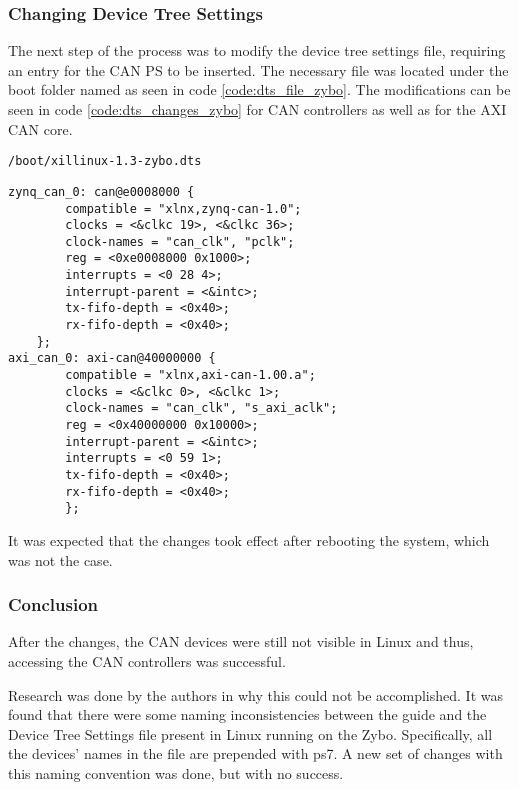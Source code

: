 \subsubsection*{Changing Device Tree Settings}
The next step of the process was to modify the device tree settings file, requiring an entry for the CAN PS to be inserted.
The necessary file was located under the boot folder named as seen in code \ref{code:dts_file_zybo}.
The modifications can be seen in code \ref{code:dts_changes_zybo} for CAN controllers as well as for the AXI CAN core.

\begin{lstlisting}[numbers=none,caption={Device tree settings file and its path.},label={code:dts_file_zybo}]
/boot/xillinux-1.3-zybo.dts
\end{lstlisting}
\begin{lstlisting}[caption={Device tree settings changes.},label={code:dts_changes_zybo}]
zynq_can_0: can@e0008000 {
        compatible = "xlnx,zynq-can-1.0";
        clocks = <&clkc 19>, <&clkc 36>;
        clock-names = "can_clk", "pclk";
        reg = <0xe0008000 0x1000>;
        interrupts = <0 28 4>;
        interrupt-parent = <&intc>;
        tx-fifo-depth = <0x40>;
        rx-fifo-depth = <0x40>;
    };
axi_can_0: axi-can@40000000 {
        compatible = "xlnx,axi-can-1.00.a";
        clocks = <&clkc 0>, <&clkc 1>;
        clock-names = "can_clk", "s_axi_aclk";
        reg = <0x40000000 0x10000>;
        interrupt-parent = <&intc>;
        interrupts = <0 59 1>;
        tx-fifo-depth = <0x40>;
        rx-fifo-depth = <0x40>;
        };
\end{lstlisting}
It was expected that the changes took effect after rebooting the system, which was not the case.

\subsubsection*{Conclusion}
After the changes, the CAN devices were still not visible in Linux and thus, accessing the CAN controllers was successful.

Research was done by the authors in why this could not be accomplished.
It was found that there were some naming inconsistencies between the guide and the Device Tree Settings file present in Linux running on the Zybo. Specifically, all the devices' names in the file are prepended with ps7.
A new set of changes with this naming convention was done, but with no success.\\

